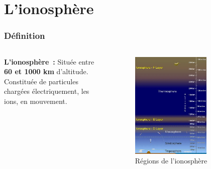 \documentclass[xcolor=dvipsnames,envcountsect]{beamer}
\begin{document}
\section{L'ionosphère}
\begin{frame}
	\frametitle{Définition}
	\begin{columns}
	    \justifying
		\begin{column}{0.5\textwidth}
	    	\textbf{L'ionosphère :} 
			Située entre \textbf{60 et 1000 km} d'altitude. \\
			Constituée de particules chargées électriquement, les ions, en mouvement.
		\end{column}
		\begin{column}{0.5\textwidth}
			\begin{figure}
				\centering
				\includegraphics[width=0.7\textwidth]{./Figures/iono_ucar.png}
				\caption {Régions de l'ionosphère \cite{ucar}}	
			\end{figure}
		\end{column}	
	\end{columns}
\end{frame}
\end{document}
